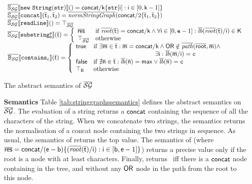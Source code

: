 \documentclass[orivec]{llncs}
\begin{document}
\begin{table}[t]
\footnotesize
\[
\begin{array}{l}
\astringgraphssemantics{\statement{new\ String(str)}}{} = \cel{concat}/\cel{k} \{ \statement{str}[\cel{i}] : \cel{i} \in [0, \cel{k}-1] \} \\
\astringgraphssemantics{\statement{concat}}{\ael{t}_1, \ael{t}_2} = \anormalizestringgraphs{\cel{concat}/2 \{\ael{t}_1, \ael{t}_2\}}\\
\astringgraphssemantics{\statement{readLine}}{} = \top_{\astringgraphs}\\
\astringgraphssemantics{\statement{substring_b^e}}{\ael{t}} = \left\{ \begin{array}{ll}
\ael{res} & \mbox{if } \aroot{\ael{t}} = \cel{concat}/\cel{k} \land \forall \cel{i} \in [0, \statement{e} -1] : \alabel{\aroot{\ael{t}}/\cel{i}} \in \cset{K} \\
\top_{\astringgraphs} & \textrm{otherwise}
\end{array}
\right.\\
\astringgraphssemanticsboolean{\statement{contains_c}}{\ael{t}} = \left\{ \begin{array}{ll}
\true & \textrm{if } \exists \ael{m} \in \ael{t} : \ael{m} = \cel{concat}/\cel{k} \land \cel{OR} \notin \apath{\ael{root}}{\ael{m}} \land \\
& \hspace{100pt} \exists \cel{i} : \alabel{\ael{m}/\cel{i}}=\statement{c}\\
\false & \mbox{if } \nexists \ael{n} \in \ael{\cel{t}} : \alabel{\ael{n}} = \cel{max} \lor \alabel{\ael{n}}=\statement{c}\\
\booltop & \textrm{otherwise}
\end{array}
\right.\\
\end{array}
\]

\caption{The abstract semantics of $\mathsf{\overline{\mathsf{\mathcal{SG}}}}$}
\label{tab:stringgraphssemantics}
\end{table}
 
\noindent \textbf{Semantics}
Table \ref{tab:stringgraphssemantics} defines the abstract semantics on $\mathsf{\overline{\mathsf{\mathcal{SG}}}}$. The evaluation of a string returns a $\mathsf{concat}$ containing the sequence of all the characters of the string. When we concatenate two strings, the semantics returns the normalisation of a concat node containing the two strings in sequence. As usual, the semantics of  returns the top value. The semantics of  (where $\mathsf{\overline{res}} = \mathsf{concat}/(\mathsf{e}-\mathsf{b}) \{ (\overline{\mathit{root}}(\mathsf{\overline{t}})/\mathsf{i}) : \mathsf{i} \in [\mathsf{b}, \mathsf{e}-1] \}$) returns a precise value only if the root is a  node with at least  characters. Finally,  returns \true\ iff there is a $\mathsf{concat}$ node containing  in the tree, and without any $\mathsf{OR}$ node in the path from the root to this node.
\end{document}
